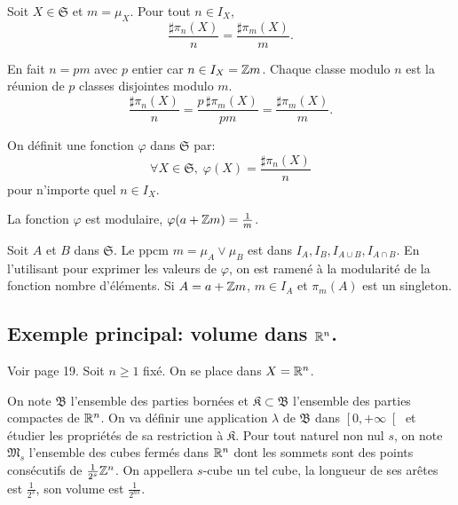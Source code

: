 \begin{lem}
  Soit $X\in \mathfrak{S}$ et $m=\mu_X$. Pour tout $n\in I_X$,
  \begin{displaymath}
      \frac{\sharp \pi_n(X)}{n} = \frac{\sharp \pi_m(X)}{m}.    
  \end{displaymath}
\end{lem}
\begin{demo}
  En fait $n = pm$ avec $p$ entier car $n \in I_X = \mathbb{Z} m$. Chaque classe modulo $n$ est la réunion de $p$ classes disjointes modulo $m$.
  \begin{displaymath}
    \frac{\sharp \pi_n(X)}{n} = \frac{p \, \sharp \pi_m(X)}{ p m} = \frac{\sharp \pi_m(X)}{m}.  
  \end{displaymath}
\end{demo}
\begin{defi}
  On définit une fonction $\varphi$ dans $\mathfrak{S}$ par:
  \begin{displaymath}
    \forall X \in \mathfrak{S}, \; \varphi(X) = \frac{\sharp \pi_n(X)}{n}
  \end{displaymath}
pour n'importe quel $n\in I_X$.
\end{defi}
\begin{prop}
  La fonction $\varphi$ est modulaire, $\varphi(a + \mathbb{Z} m) = \frac{1}{m}$.
\end{prop}
\begin{demo}
  Soit $A$ et $B$ dans $\mathfrak{S}$. Le ppcm $m = \mu_A \vee \mu_B$ est dans $I_A, I_B, I_{A\cup B}, I_{A\cap B}$. En l'utilisant pour exprimer les valeurs de $\varphi$, on est ramené à la modularité de la fonction nombre d'éléments.\newline
  Si $A= a + \mathbb{Z} m$, $m \in I_A$ et $\pi_m(A)$ est un singleton. 
\end{demo}


\subsection{Exemple principal: volume dans $\mathbb{R}^n$.}\label{Expleppal}
Voir page 19.
Soit $n\geq 1$ fixé. On se place dans $X = \mathbb{R}^n$.

\noindent On note $\mathfrak{B}$ l'ensemble des parties bornées et $\mathfrak{K} \subset \mathfrak{B}$ l'ensemble des parties compactes de $\mathbb{R}^n$. On va définir une application $\lambda$ de $\mathfrak{B}$ dans $\left[0, + \infty\right[$ et étudier les propriétés de sa restriction à $\mathfrak{K}$.\newline
Pour tout naturel non nul $s$, on note $\mathfrak{M}_s$ l'ensemble des cubes fermés dans $\mathbb{R}^n$ dont les sommets sont des points consécutifs de $\frac{1}{2^s}\mathbb{Z}^n$. On appellera $s$-cube un tel cube, la longueur de ses arêtes est $\frac{1}{2^s}$, son volume est $\frac{1}{2^{ns}}$.


